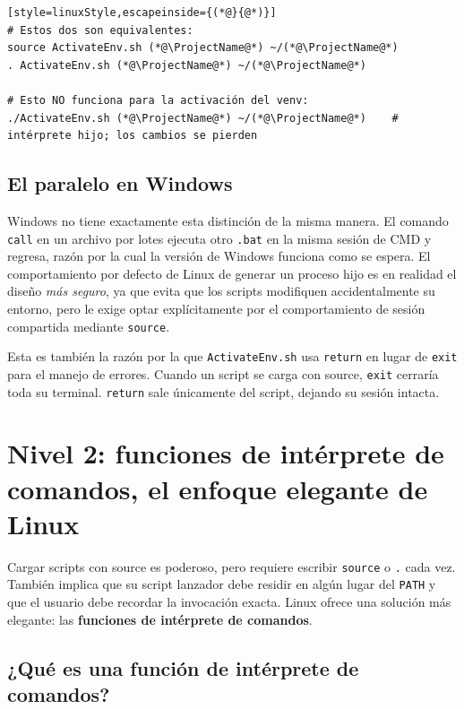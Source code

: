 \begin{lstlisting}[style=linuxStyle,escapeinside={(*@}{@*)}]
# Estos dos son equivalentes:
source ActivateEnv.sh (*@\ProjectName@*) ~/(*@\ProjectName@*)
. ActivateEnv.sh (*@\ProjectName@*) ~/(*@\ProjectName@*)

# Esto NO funciona para la activación del venv:
./ActivateEnv.sh (*@\ProjectName@*) ~/(*@\ProjectName@*)    # intérprete hijo; los cambios se pierden
\end{lstlisting}

\subsection{El paralelo en Windows}

Windows no tiene exactamente esta distinción de la misma manera. El comando
\texttt{call} en un archivo por lotes ejecuta otro \texttt{.bat} en la
misma sesión de CMD y regresa, razón por la cual la versión de Windows
funciona como se espera. El comportamiento por defecto de Linux de generar
un proceso hijo es en realidad el diseño \emph{más seguro}, ya que evita
que los scripts modifiquen accidentalmente su entorno, pero le exige optar
explícitamente por el comportamiento de sesión compartida mediante
\texttt{source}.

\begin{notebox}
Esta es también la razón por la que \texttt{ActivateEnv.sh} usa
\texttt{return} en lugar de \texttt{exit} para el manejo de errores.
Cuando un script se carga con source, \texttt{exit} cerraría toda su
terminal. \texttt{return} sale únicamente del script, dejando su sesión
intacta.
\end{notebox}

\section{Nivel 2: funciones de intérprete de comandos, el enfoque elegante de Linux}
\label{sec:level2}

Cargar scripts con source es poderoso, pero requiere escribir \texttt{source}
o \texttt{.} cada vez. También implica que su script lanzador debe residir
en algún lugar del \texttt{PATH} y que el usuario debe recordar la
invocación exacta. Linux ofrece una solución más elegante: las
\textbf{funciones de intérprete de comandos}.

\subsection{¿Qué es una función de intérprete de comandos?}

